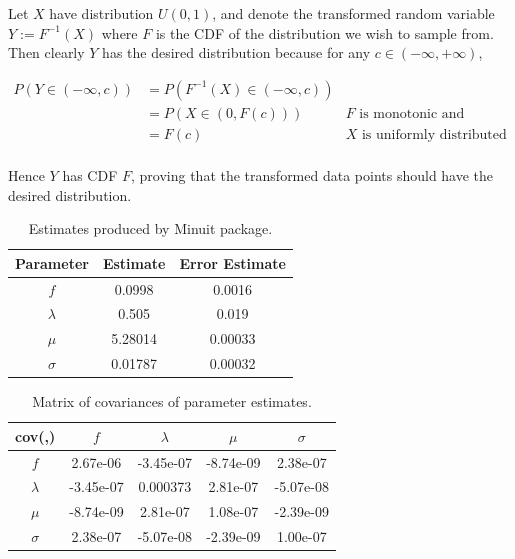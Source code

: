 \documentclass[12pt]{article}
\begin{document}
Let $X$ have distribution $U(0,1)$, and denote the transformed random variable $Y:=F^{-1}(X)$ where $F$ is the CDF of the distribution we wish to sample from.
Then clearly $Y$ has the desired distribution because for any $c\in(-\infty,+\infty)$,

\begin{align*}
    P(Y\in(-\infty, c)) & = P(F^{-1}(X)\in(-\infty, c)) \\
                        & = P(X\in(0, F(c))) & \text{$F$ is monotonic and increasing}\\
                        & = F(c) & \text{$X$ is uniformly distributed}\\
\end{align*}

Hence $Y$ has CDF $F$, proving that the transformed data points should have the desired distribution.

\begin{table}[htp]
  \centering
  \begin{tabular}{| c | c | c |}
      \hline
      Parameter & Estimate & Error Estimate \\
      \hline
      $f$  & 0.0998 & 0.0016 \\
      \hline
      $\lambda$ & 0.505 & 0.019 \\
      \hline
      $\mu$ & 5.28014 & 0.00033 \\
      \hline
      $\sigma$ & 0.01787 & 0.00032 \\
      \hline
  \end{tabular}
  \caption{Estimates produced by Minuit package.}
  \label{tab1}
  \end{table}

\begin{table}[htp]
    \centering
    \begin{tabular}{| c | c | c | c | c |}
        \hline
        cov(,) & $f$ & $\lambda$ & $\mu$ & $\sigma$ \\
        \hline
        $f$       & 2.67e-06  & -3.45e-07 & -8.74e-09 &  2.38e-07 \\
        \hline
        $\lambda$ & -3.45e-07 &  0.000373 &  2.81e-07 & -5.07e-08 \\
        \hline
        $\mu$     & -8.74e-09 &  2.81e-07 &  1.08e-07 & -2.39e-09 \\
        \hline
        $\sigma$  & 2.38e-07  & -5.07e-08 & -2.39e-09 &  1.00e-07 \\
        \hline
\end{tabular}
\caption{Matrix of covariances of parameter estimates.}
\label{tab2}
\end{table}
\end{document}
